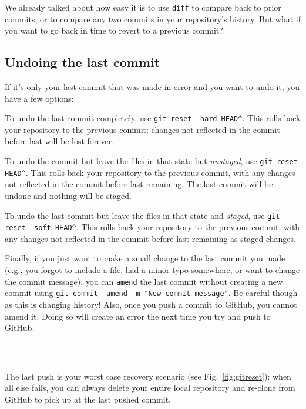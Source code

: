 \documentclass[12pt,letterpaper]{article}
\begin{document}
We already talked about how easy it is to use \texttt{diff} to compare back to prior commits, or to compare any two commits in your repository's history.
But what if you want to go back in time to revert to a previous commit?

\subsection{Undoing the last commit}
If it's only your last commit that was made in error and you want to undo it, you have a few options:

To undo the last commit completely, use \texttt{git reset --hard HEAD\^}.
This rolls back your repository to the previous commit;
changes not reflected in the commit-before-last will be lost forever.

To undo the commit but leave the files in that state but \emph{unstaged}, use \texttt{git reset HEAD\^}.
This rolls back your repository to the previous commit, with any changes not reflected in the commit-before-last remaining.
The last commit will be undone and nothing will be staged.

To undo the last commit but leave the files in that state and \emph{staged}, use \texttt{git reset --soft HEAD\^}.
This rolls back your repository to the previous commit, with any changes not reflected in the commit-before-last remaining as staged changes.

Finally, if you just want to make a small change to the last commit you made (e.g., you forgot to include a file, had a minor typo somewhere, or want to change the commit message), you can \texttt{amend} the last commit without creating a new commit using \texttt{git commit --amend -m "New commit message"}.
Be careful though as this is changing history!
Also, once you push a commit to GitHub, you cannot amend it.
Doing so will create an error the next time you try and push to GitHub.


\subsection{}
~~~~~~~~~~~~~~



The last push is your worst case recovery scenario (see Fig.~\ref{fig:gitreset}):  when all else fails, you can always delete your entire local repository and re-clone from GitHub to pick up at the last pushed commit.
\end{document}

